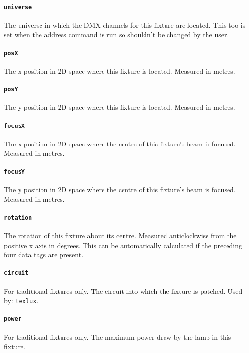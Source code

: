 \documentclass[a4paper]{article}
\begin{document}
\paragraph{\texttt{universe}}
The universe in which the DMX channels for this fixture are located. This too 
is set when the address command is run so shouldn't be changed by the user. 

\paragraph{\texttt{posX}}
The x position in 2D space where this fixture is located. Measured in metres.

\paragraph{\texttt{posY}}
The y position in 2D space where this fixture is located. Measured in metres.

\paragraph{\texttt{focusX}}
The x position in 2D space where the centre of this fixture's beam is 
focused. Measured in metres.

\paragraph{\texttt{focusY}}
The y position in 2D space where the centre of this fixture's beam is 
focused. Measured in metres.

\paragraph{\texttt{rotation}}
The rotation of this fixture about its centre. Measured anticlockwise from 
the positive x axis in degrees. This can be automatically calculated if the 
preceding four data tags are present.

\paragraph{\texttt{circuit}}
For traditional fixtures only. The circuit into which the fixture is patched. 
Used by: \texttt{texlux}.

\paragraph{\texttt{power}}
For traditional fixtures only. The maximum power draw by the lamp in this 
fixture.
\end{document}
